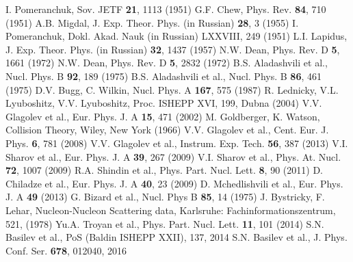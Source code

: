 \documentclass[twocolumn,epjc3]{svjour3}
\begin{document}
\begin{thebibliography}{99}
  I. Pomeranchuk, Sov. JETF \textbf{21}, 1113 (1951)
  G.F. Chew, Phys. Rev. \textbf{84}, 710 (1951)
  A.B. Migdal, J. Exp. Theor. Phys. (in Russian) \textbf{28}, 3 (1955)
  I. Pomeranchuk, Dokl. Akad. Nauk (in Russian) LXXVIII, 249 (1951)
  L.I. Lapidus, J. Exp. Theor. Phys. (in Russian) \textbf{32}, 1437 (1957)
  N.W. Dean, Phys. Rev. D \textbf{5}, 1661 (1972)
  N.W. Dean, Phys. Rev. D \textbf{5}, 2832 (1972)
  B.S. Aladashvili et al., Nucl. Phys. B \textbf{92}, 189 (1975)
  B.S. Aladashvili et al., Nucl. Phys. B \textbf{86}, 461 (1975)
  D.V. Bugg, C. Wilkin, Nucl. Phys. A \textbf{167}, 575 (1987)
  R. Lednicky, V.L. Lyuboshitz, V.V. Lyuboshitz, Proc. ISHEPP XVI, 199,
  Dubna (2004)
  V.V. Glagolev et al., Eur. Phys. J. A \textbf{15}, 471 (2002)
  M. Goldberger, K. Watson, Collision Theory, Wiley, New York (1966)
  V.V. Glagolev et al., Cent. Eur. J. Phys. \textbf{6}, 781 (2008)
  V.V. Glagolev et al., Instrum. Exp. Tech. \textbf{56}, 387 (2013)
  V.I. Sharov et al., Eur. Phys. J. A \textbf{39}, 267 (2009)
  V.I. Sharov et al., Phys. At. Nucl. \textbf{72}, 1007 (2009)
  R.A. Shindin et al., Phys. Part. Nucl. Lett. \textbf{8}, 90 (2011)
  D. Chiladze et al., Eur. Phys. J. A \textbf{40}, 23 (2009)
  D. Mchedlishvili et al., Eur. Phys. J. A \textbf{49} (2013)
  G. Bizard et al., Nucl. Phys B \textbf{85}, 14 (1975)
  J. Bystricky, F. Lehar, Nucleon-Nucleon Scattering data, Karlsruhe:
  Fachinformationszentrum, 521, (1978)
  Yu.A. Troyan et al., Phys. Part. Nucl. Lett. \textbf{11}, 101 (2014)
  S.N. Basilev et al., PoS (Baldin ISHEPP XXII), 137, 2014
  S.N. Basilev et al., J. Phys. Conf. Ser. \textbf{678}, 012040, 2016
\end{thebibliography}
\end{document}
